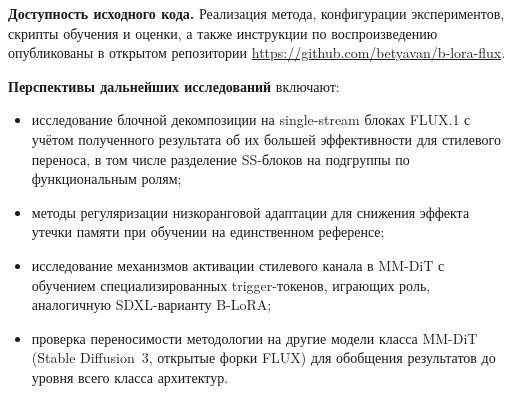 \textbf{Доступность исходного кода.} Реализация метода, конфигурации
экспериментов, скрипты обучения и оценки, а также инструкции по воспроизведению
опубликованы в открытом репозитории
\url{https://github.com/betyavan/b-lora-flux}.

\textbf{Перспективы дальнейших исследований} включают:
\begin{itemize}\itemsep0.2em
    \item исследование блочной декомпозиции на single-stream блоках FLUX.1
          с учётом полученного результата об их большей эффективности для
          стилевого переноса, в том числе разделение SS-блоков на подгруппы
          по функциональным ролям;
    \item методы регуляризации низкоранговой адаптации для снижения эффекта
          утечки памяти при обучении на единственном референсе;
    \item исследование механизмов активации стилевого канала в MM-DiT
          с обучением специализированных trigger-токенов, играющих роль,
          аналогичную SDXL-варианту B-LoRA;
    \item проверка переносимости методологии на другие модели класса MM-DiT
          (Stable Diffusion~3, открытые форки FLUX) для обобщения результатов
          до уровня всего класса архитектур.
\end{itemize}

